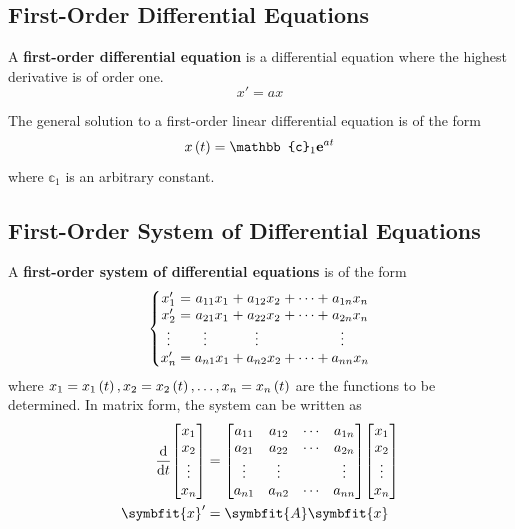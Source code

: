 \documentclass{article}
\begin{document}
	\subsection{First-Order Differential Equations}
	\begin{definition}
		A \textbf{first-order differential equation} is a differential equation where the highest derivative is of order one. 
		\begin{equation*}
			x' = a x
		\end{equation*}
	\end{definition}
	\begin{theorem}
		The general solution to a first-order linear differential equation is of the form
		\begin{equation*}
			\func{x}{t} = \mathbb{c}_1 \e^{a t}
		\end{equation*}
		where $\mathbb{c}_1$ is an arbitrary constant.
	\end{theorem}
	\subsection{First-Order System of Differential Equations}
	\begin{definition}
		A \textbf{first-order system of differential equations} is of the form
		\begin{equation*}
			\left\{
			\setlength\arraycolsep{0pt}
			\begin{array}{ c >{{}}c<{{}} c >{{}}c<{{}} c >{{}}c<{{}} c >{{}}c<{{}} c  }
			x'_1               &=& a_{11}x_1                         &+& a_{12}x_2                         &+& \cdots &+& a_{1n}x_n \\
			x'_2               &=& a_{21}x_1                         &+& a_{22}x_2                         &+& \cdots &+& a_{2n}x_n \\
			\vdotswithin{x'_3} & & \vdotswithin{a_{31}}\phantom{x_1} & & \vdotswithin{a_{32}}\phantom{x_2} & &        & & \vdotswithin{a_{3n}}\phantom{x_n} \\ 
			x'_n               &=& a_{n1}x_1                         &+& a_{n2}x_2                         &+& \cdots &+& a_{nn}x_n 
			\end{array}
			\right.
		\end{equation*}
		where $x_1={x_1}\left({t}\right), x_2={x_2}\left({t}\right), \dots, x_n={x_n}\left({t}\right)$ are the functions to be determined. In matrix form, the system can be written as
		\begin{align*}
			\dv{t}\mqty[x_1 \\ x_2 \\ \vdots \\ x_n] &= \mqty[
				a_{11} & a_{12} & \cdots & a_{1n} \\
				a_{21} & a_{22} & \cdots & a_{2n} \\
				\vdots & \vdots &        & \vdots \\
				a_{n1} & a_{n2} & \cdots & a_{nn}
			] \mqty[x_1 \\ x_2 \\ \vdots \\ x_n] \\
			\symbfit{x}' &= \symbfit{A} \symbfit{x}
		\end{align*}
	\end{definition}
\end{document}
